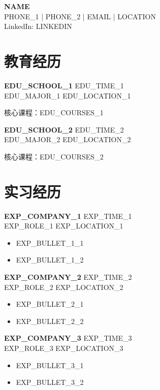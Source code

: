 \documentclass[10pt, a4paper]{article}
\newcommand{\expheader}[4]{%
    \vspace{3pt}%
    {\bfseries #1} \hfill {#3} \\
    {#2} \hfill {#4}%
    \vspace{3pt}%
}
\newcommand{\eduheader}[4]{%
    \vspace{3pt}%
    {\bfseries #1} \hfill {#3} \\
    {#2} \hfill {#4}%
    \vspace{3pt}%
}
\begin{document}
\begin{center}
    {\LARGE\bfseries {{NAME}}} \\[4pt]
    {{PHONE_1}} \enspace|\enspace
    {{PHONE_2}} \enspace|\enspace
    {{EMAIL}} \enspace|\enspace
    {{LOCATION}}
    \\[2pt]
    LinkedIn: {{LINKEDIN}}
\end{center}

\vspace{0.2em}

\section{教育经历}

\eduheader
    {{{EDU_SCHOOL_1}}}
    {{{EDU_MAJOR_1}}}
    {{{EDU_TIME_1}}}
    {{{EDU_LOCATION_1}}}

核心课程：{{EDU_COURSES_1}}

\eduheader
    {{{EDU_SCHOOL_2}}}
    {{{EDU_MAJOR_2}}}
    {{{EDU_TIME_2}}}
    {{{EDU_LOCATION_2}}}

核心课程：{{EDU_COURSES_2}}

\section{实习经历}

\expheader
    {{{EXP_COMPANY_1}}}
    {{{EXP_ROLE_1}}}
    {{{EXP_TIME_1}}}
    {{{EXP_LOCATION_1}}}
\begin{itemize}
    \item {{EXP_BULLET_1_1}}
    \item {{EXP_BULLET_1_2}}
\end{itemize}

\expheader
    {{{EXP_COMPANY_2}}}
    {{{EXP_ROLE_2}}}
    {{{EXP_TIME_2}}}
    {{{EXP_LOCATION_2}}}
\begin{itemize}
    \item {{EXP_BULLET_2_1}}
    \item {{EXP_BULLET_2_2}}
\end{itemize}

\expheader
    {{{EXP_COMPANY_3}}}
    {{{EXP_ROLE_3}}}
    {{{EXP_TIME_3}}}
    {{{EXP_LOCATION_3}}}
\begin{itemize}
    \item {{EXP_BULLET_3_1}}
    \item {{EXP_BULLET_3_2}}
\end{itemize}
\end{document}
